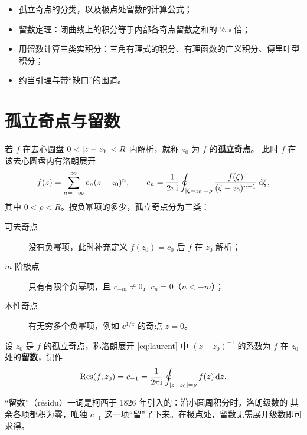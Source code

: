 \documentclass{mojing-notes}
\begin{document}

\begin{keypoints}
\begin{itemize}
  \item 孤立奇点的分类，以及极点处留数的计算公式；
  \item 留数定理：闭曲线上的积分等于内部各奇点留数之和的 $2\pi\ii$ 倍；
  \item 用留数计算三类实积分：三角有理式的积分、有理函数的广义积分、傅里叶型积分；
  \item 约当引理与带“缺口”的围道。
\end{itemize}
\end{keypoints}

\section{孤立奇点与留数}

若 $f$ 在去心圆盘 $0<\lvert z-z_0\rvert<R$ 内解析，就称 $z_0$ 为 $f$ 的\textbf{孤立奇点}。
此时 $f$ 在该去心圆盘内有洛朗展开
\begin{equation}\label{eq:laurent}
  f(z)=\sum_{n=-\infty}^{\infty}c_n(z-z_0)^n,\qquad
  c_n=\frac{1}{2\pi\mathrm{i}}\oint_{\lvert\zeta-z_0\rvert=\rho}\frac{f(\zeta)}{(\zeta-z_0)^{n+1}}\mathop{}\!\mathrm{d}\zeta,
\end{equation}
其中 $0<\rho<R$。按负幂项的多少，孤立奇点分为三类：
\begin{description}
  \item[可去奇点] 没有负幂项，此时补充定义 $f(z_0)=c_0$ 后 $f$ 在 $z_0$ 解析；
  \item[$m$ 阶极点] 只有有限个负幂项，且 $c_{-m}\ne0$，$c_n=0$（$n<-m$）；
  \item[本性奇点] 有无穷多个负幂项，例如 $\ee^{1/z}$ 的奇点 $z=0$。
\end{description}

\begin{definition}[留数]
设 $z_0$ 是 $f$ 的孤立奇点，称洛朗展开 \cref{eq:laurent} 中 $(z-z_0)^{-1}$ 的系数为
$f$ 在 $z_0$ 处的\textbf{留数}，记作
\[
  \operatorname{Res}(f,z_0)=c_{-1}=\frac{1}{2\pi\mathrm{i}}\oint_{\lvert z-z_0\rvert=\rho}f(z)\mathop{}\!\mathrm{d} z .
\]
\end{definition}

“留数”（résidu）一词是柯西于 1826 年引入的：沿小圆周积分时，洛朗级数的
其余各项都积为零，唯独 $c_{-1}$ 这一项“留”了下来。在极点处，留数无需展开级数即可求得。
\end{document}
